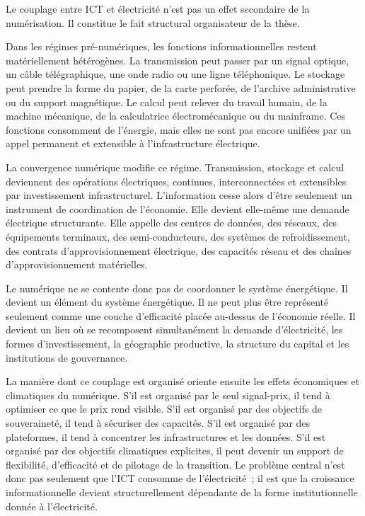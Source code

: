 Le couplage entre ICT et électricité n'est pas un effet secondaire de la numérisation. Il constitue le fait structural organisateur de la thèse.

Dans les régimes pré-numériques, les fonctions informationnelles restent matériellement hétérogènes. La transmission peut passer par un signal optique, un câble télégraphique, une onde radio ou une ligne téléphonique. Le stockage peut prendre la forme du papier, de la carte perforée, de l'archive administrative ou du support magnétique. Le calcul peut relever du travail humain, de la machine mécanique, de la calculatrice électromécanique ou du mainframe. Ces fonctions consomment de l'énergie, mais elles ne sont pas encore unifiées par un appel permanent et extensible à l'infrastructure électrique.

La convergence numérique modifie ce régime. Transmission, stockage et calcul deviennent des opérations électriques, continues, interconnectées et extensibles par investissement infrastructurel. L'information cesse alors d'être seulement un instrument de coordination de l'économie. Elle devient elle-même une demande électrique structurante. Elle appelle des centres de données, des réseaux, des équipements terminaux, des semi-conducteurs, des systèmes de refroidissement, des contrats d'approvisionnement électrique, des capacités réseau et des chaînes d'approvisionnement matérielles.

Le numérique ne se contente donc pas de coordonner le système énergétique. Il devient un élément du système énergétique. Il ne peut plus être représenté seulement comme une couche d'efficacité placée au-dessus de l'économie réelle. Il devient un lieu où se recomposent simultanément la demande d'électricité, les formes d'investissement, la géographie productive, la structure du capital et les institutions de gouvernance.

La manière dont ce couplage est organisé oriente ensuite les effets économiques et climatiques du numérique. S'il est organisé par le seul signal-prix, il tend à optimiser ce que le prix rend visible. S'il est organisé par des objectifs de souveraineté, il tend à sécuriser des capacités. S'il est organisé par des plateformes, il tend à concentrer les infrastructures et les données. S'il est organisé par des objectifs climatiques explicites, il peut devenir un support de flexibilité, d'efficacité et de pilotage de la transition. Le problème central n'est donc pas seulement que l'ICT consomme de l'électricité~; il est que la croissance informationnelle devient structurellement dépendante de la forme institutionnelle donnée à l'électricité.

